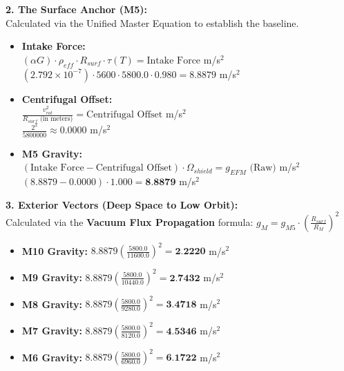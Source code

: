 \documentclass[11pt, a4paper]{article}
\begin{document}
  \vspace{1.0em}
  \noindent \textbf{2. The Surface Anchor (M5):} \\
  \hspace*{1em} Calculated via the Unified Master Equation to establish the baseline.
  \begin{itemize}
    \item \textbf{Intake Force:} \\[0.5em]
    \hspace*{2em} $(\alpha G) \cdot \rho_{eff} \cdot R_{surf} \cdot \tau(T) = \text{Intake Force}$ m/s$^2$ \\[1em]
    \hspace*{2em} $(2.792 \times 10^{-7}) \cdot 5600 \cdot 5800.0 \cdot 0.980 = 8.8879$ m/s$^2$
    
    \item \textbf{Centrifugal Offset:} \\[0.5em]
    \hspace*{2em} $\frac{v_{rot}^2}{R_{surf} \text{ (in meters)}} = \text{Centrifugal Offset}$ m/s$^2$ \\[1em]
    \hspace*{2em} $\frac{2^2}{5800000} \approx 0.0000$ m/s$^2$
    
    \item \textbf{M5 Gravity:} \\[0.5em]
    \hspace*{2em} $(\text{Intake Force} - \text{Centrifugal Offset}) \cdot \Omega_{shield} = g_{EFM} \text{ (Raw)}$ m/s$^2$ \\[1em]
    \hspace*{2em} $(8.8879 - 0.0000) \cdot 1.000 = \textbf{8.8879}$ m/s$^2$
  \end{itemize}

  \clearpage
  \noindent \textbf{3. Exterior Vectors (Deep Space to Low Orbit):} \\
  \hspace*{1em} Calculated via the \textbf{Vacuum Flux Propagation} formula: $g_M = g_{M5} \cdot \left( \frac{R_{surf}}{R_M} \right)^2$
  \begin{itemize}
    \item \textbf{M10 Gravity:} $8.8879 \left( \frac{5800.0}{11600.0} \right)^2 = \textbf{2.2220}$ m/s$^2$
    \item \textbf{M9 Gravity:} $8.8879 \left( \frac{5800.0}{10440.0} \right)^2 = \textbf{2.7432}$ m/s$^2$
    \item \textbf{M8 Gravity:} $8.8879 \left( \frac{5800.0}{9280.0} \right)^2 = \textbf{3.4718}$ m/s$^2$
    \item \textbf{M7 Gravity:} $8.8879 \left( \frac{5800.0}{8120.0} \right)^2 = \textbf{4.5346}$ m/s$^2$
    \item \textbf{M6 Gravity:} $8.8879 \left( \frac{5800.0}{6960.0} \right)^2 = \textbf{6.1722}$ m/s$^2$
  \end{itemize}
\end{document}
